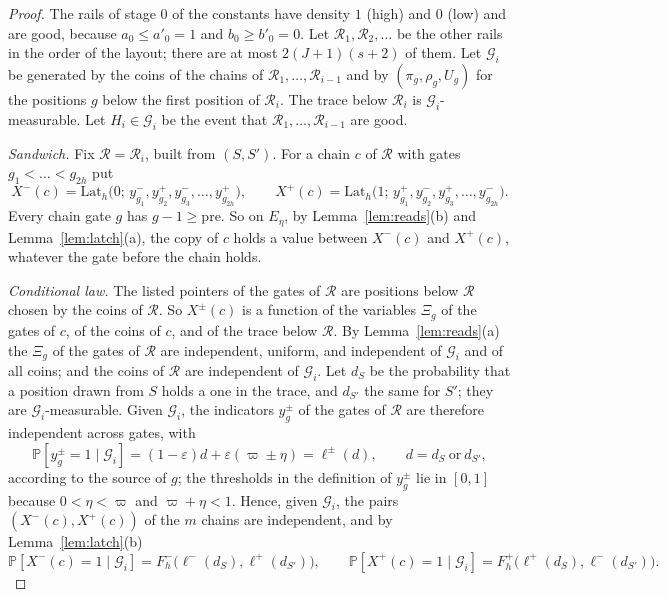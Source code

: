 \documentclass[11pt]{amsart}
\theoremstyle{definition}
\theoremstyle{remark}
\newcommand{\eps}{\varepsilon}
\newcommand{\PP}{\mathbb{P}}
\begin{document}
\begin{proof}
The rails of stage $0$ of the constants have density $1$ (high) and $0$ (low) and are good,
because $a_0\le a'_0=1$ and $b_0\ge b'_0=0$. Let $\mathcal R_1,\mathcal R_2,\dots$ be the other
rails in the order of the layout; there are at most $2(J+1)(s+2)$ of them. Let $\mathcal G_i$ be
generated by the coins of the chains of $\mathcal R_1,\dots,\mathcal R_{i-1}$ and by
$(\pi_g,\rho_g,U_g)$ for the positions $g$ below the first position of $\mathcal R_i$. The trace
below $\mathcal R_i$ is $\mathcal G_i$-measurable. Let $H_i\in\mathcal G_i$ be the event that
$\mathcal R_1,\dots,\mathcal R_{i-1}$ are good.

\emph{Sandwich.} Fix $\mathcal R=\mathcal R_i$, built from $(S,S')$. For a chain $c$ of
$\mathcal R$ with gates $g_1<\dots<g_{2h}$ put
\[
X^-(c)=\mathrm{Lat}_h\bigl(0;\,y^-_{g_1},y^+_{g_2},y^-_{g_3},\dots,y^+_{g_{2h}}\bigr),\qquad
X^+(c)=\mathrm{Lat}_h\bigl(1;\,y^+_{g_1},y^-_{g_2},y^+_{g_3},\dots,y^-_{g_{2h}}\bigr).
\]
Every chain gate $g$ has $g-1\ge\mathrm{pre}$. So on $E_\eta$, by Lemma~\ref{lem:reads}(b) and
Lemma~\ref{lem:latch}(a), the copy of $c$ holds a value between $X^-(c)$ and $X^+(c)$, whatever the
gate before the chain holds.

\emph{Conditional law.} The listed pointers of the gates of $\mathcal R$ are positions below
$\mathcal R$ chosen by the coins of $\mathcal R$. So $X^\pm(c)$ is a function of the variables
$\Xi_g$ of the gates of $c$, of the coins of $c$, and of the trace below $\mathcal R$. By
Lemma~\ref{lem:reads}(a) the $\Xi_g$ of the gates of $\mathcal R$ are independent, uniform, and
independent of $\mathcal G_i$ and of all coins; and the coins of $\mathcal R$ are independent of
$\mathcal G_i$. Let $d_S$ be the probability that a position drawn from $S$ holds a one in the
trace, and $d_{S'}$ the same for $S'$; they are $\mathcal G_i$-measurable. Given $\mathcal G_i$,
the indicators $y^\pm_g$ of the gates of $\mathcal R$ are therefore independent across gates, with
\[
\PP[y^\pm_g=1\mid\mathcal G_i]=(1-\eps)d+\eps(\varpi\pm\eta)=\ell^\pm(d),\qquad
d=d_S\ \text{or}\ d_{S'},
\]
according to the source of $g$; the thresholds in the definition of $y^\pm_g$ lie in $[0,1]$
because $0<\eta<\varpi$ and $\varpi+\eta<1$. Hence, given $\mathcal G_i$, the pairs $(X^-(c),X^+(c))$ of the
$m$ chains are independent, and by Lemma~\ref{lem:latch}(b)
\[
\PP[X^-(c)=1\mid\mathcal G_i]=F^-_h\bigl(\ell^-(d_S),\ell^+(d_{S'})\bigr),\qquad
\PP[X^+(c)=1\mid\mathcal G_i]=F^+_h\bigl(\ell^+(d_S),\ell^-(d_{S'})\bigr).
\]


\end{proof}
\end{document}
